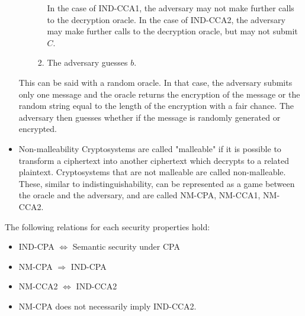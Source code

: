 \documentclass{report}
\begin{document}
\begin{itemize}
\begin{itemize}
\begin{enumerate}
						\subitem In the case of IND-CCA1, the adversary may not make further calls to the decryption oracle.
						\subitem In the case of IND-CCA2, the adversary may make further calls to the decryption oracle, but may not submit $C$.
					\item The adversary guesses $b$.
				\end{enumerate}
			\end{itemize}
			This can be said with a random oracle. In that case, the adversary submits only one message and the oracle returns the encryption of the message or the random string equal to the length of the encryption with a fair chance. The adversary then guesses whether if the message is randomly generated or encrypted.

			\item Non-malleability
			\subitem Cryptosystems are called "malleable" if it is possible to transform a ciphertext into another ciphertext which decrypts to a related plaintext. Cryptosystems that are not malleable are called non-malleable. These, similar to indistinguishability, can be represented as a game between the oracle and the adversary, and are called NM-CPA, NM-CCA1, NM-CCA2.
		\end{itemize}
	
		\begin{thm}
			The following relations for each security properties hold:
			\begin{itemize}
				\item IND-CPA $\Leftrightarrow$ Semantic security under CPA
				\item NM-CPA $\Rightarrow$ IND-CPA
				\item NM-CCA2 $\Leftrightarrow$ IND-CCA2
				\item NM-CPA  does not necessarily imply IND-CCA2.
			\end{itemize}
		\end{thm}
		
\end{document}
